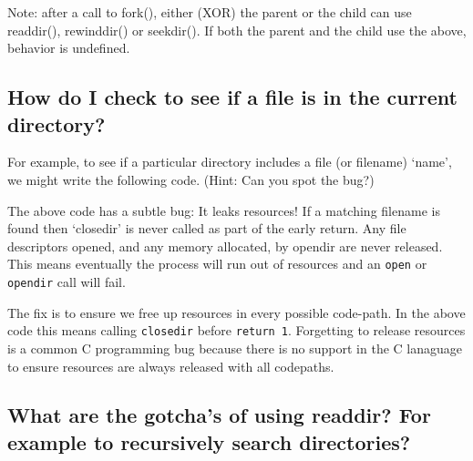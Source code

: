 Note: after a call to fork(), either (XOR) the parent or the child can
use readdir(), rewinddir() or seekdir(). If both the parent and the
child use the above, behavior is undefined.

\subsection{How do I check to see if a file is in the current
directory?}\label{how-do-i-check-to-see-if-a-file-is-in-the-current-directory}

For example, to see if a particular directory includes a file (or
filename) `name', we might write the following code. (Hint: Can you spot
the bug?)

\begin{Shaded}
\begin{Highlighting}[]
   
     
     
         
         \NormalTok{; }
        \NormalTok{\}}
    \NormalTok{\}}
     \NormalTok{; }
\NormalTok{\}}
\end{Highlighting}
\end{Shaded}

The above code has a subtle bug: It leaks resources! If a matching
filename is found then `closedir' is never called as part of the early
return. Any file descriptors opened, and any memory allocated, by
opendir are never released. This means eventually the process will run
out of resources and an \texttt{open} or \texttt{opendir} call will
fail.

The fix is to ensure we free up resources in every possible code-path.
In the above code this means calling \texttt{closedir} before
\texttt{return\ 1}. Forgetting to release resources is a common C
programming bug because there is no support in the C lanaguage to ensure
resources are always released with all codepaths.

\subsection{What are the gotcha's of using readdir? For example to
recursively search
directories?}\label{what-are-the-gotchas-of-using-readdir-for-example-to-recursively-search-directories}

